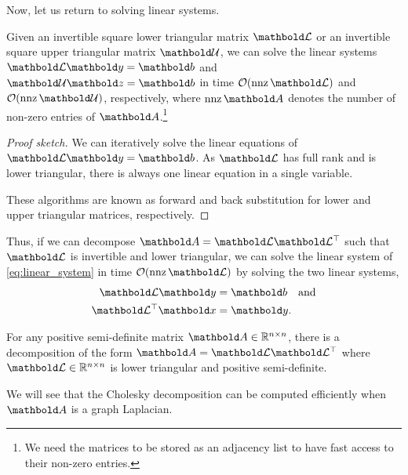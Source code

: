 Now, let us return to solving linear systems.

\begin{lem}
Given an invertible square lower triangular matrix $\mCalL$ or an invertible square upper triangular matrix $\mCalU$, we can solve the linear systems $\mCalL\vy = \vb$ and $\mCalU\vz = \vb$ in time $\LandauO{\nnz{\mCalL}}$ and $\LandauO{\nnz{\mCalU}}$, respectively, where $\nnz{\mA}$ denotes the number of non-zero entries of $\mA$.\footnote{We need the matrices to be stored as an adjacency list to have fast access to their non-zero entries.}
\end{lem}\begin{proof}[Proof sketch] We can iteratively solve the linear equations of $\mCalL\vy = \vb$. As $\mCalL$ has full rank and is lower triangular, there is always one linear equation in a single variable.

These algorithms are known as forward and back substitution for lower and upper triangular matrices, respectively.
\end{proof}

Thus, if we can decompose $\mA = \mCalL\trans{\mCalL}$ such that $\mCalL$ is invertible and lower triangular, we can solve the linear system of \cref{eq:linear_system} in time $\LandauO{\nnz{\mCalL}}$ by solving the two linear systems, \begin{align}
    \mCalL\vy &= \vb \quad\text{and} \\
    \trans{\mCalL}\vx &= \vy.
\end{align}

\begin{lem} For any positive semi-definite matrix $\mA \in \R^{n \times n}$, there is a decomposition of the form $\mA = \mCalL\trans{\mCalL}$ where $\mCalL \in \R^{n \times n}$ is lower triangular and positive semi-definite.
\end{lem}

We will see that the Cholesky decomposition can be computed efficiently when $\mA$ is a graph Laplacian.